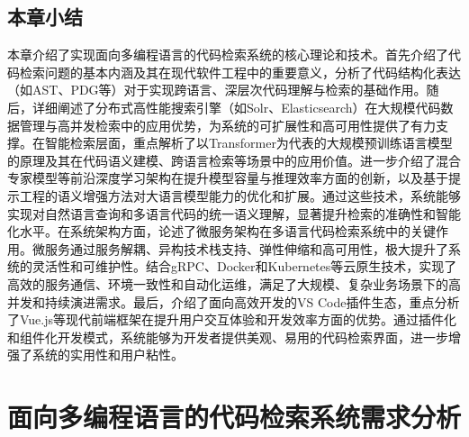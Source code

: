 \documentclass[UTF8,a4paper,12pt]{ctexart}
\numberwithin{equation}{section}
\begin{document}
\subsection{本章小结}
本章介绍了实现面向多编程语言的代码检索系统的核心理论和技术。首先介绍了代码检索问题的基本内涵及其在现代软件工程中的重要意义，分析了代码结构化表达（如AST、PDG等）对于实现跨语言、深层次代码理解与检索的基础作用。随后，详细阐述了分布式高性能搜索引擎（如Solr、Elasticsearch）在大规模代码数据管理与高并发检索中的应用优势，为系统的可扩展性和高可用性提供了有力支撑。在智能检索层面，重点解析了以Transformer为代表的大规模预训练语言模型的原理及其在代码语义建模、跨语言检索等场景中的应用价值。进一步介绍了混合专家模型等前沿深度学习架构在提升模型容量与推理效率方面的创新，以及基于提示工程的语义增强方法对大语言模型能力的优化和扩展。通过这些技术，系统能够实现对自然语言查询和多语言代码的统一语义理解，显著提升检索的准确性和智能化水平。在系统架构方面，论述了微服务架构在多语言代码检索系统中的关键作用。微服务通过服务解耦、异构技术栈支持、弹性伸缩和高可用性，极大提升了系统的灵活性和可维护性。结合gRPC、Docker和Kubernetes等云原生技术，实现了高效的服务通信、环境一致性和自动化运维，满足了大规模、复杂业务场景下的高并发和持续演进需求。最后，介绍了面向高效开发的VS Code插件生态，重点分析了Vue.js等现代前端框架在提升用户交互体验和开发效率方面的优势。通过插件化和组件化开发模式，系统能够为开发者提供美观、易用的代码检索界面，进一步增强了系统的实用性和用户粘性。
\newpage
{}
\section{面向多编程语言的代码检索系统需求分析}
\end{document}
